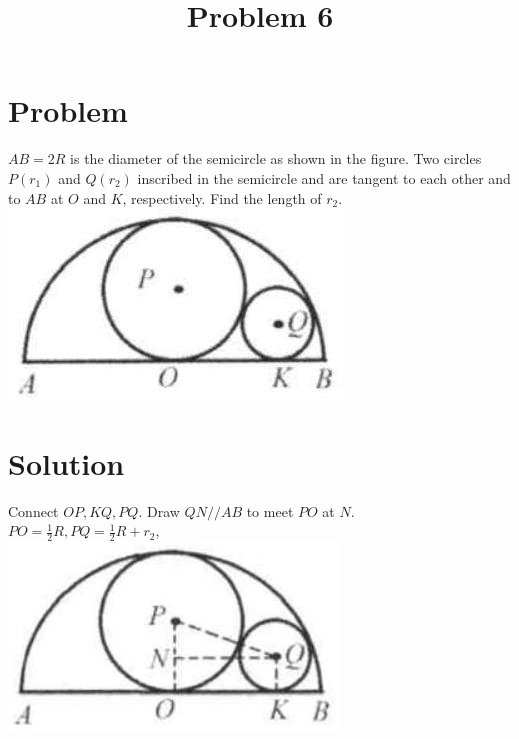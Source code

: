 \documentclass{article}
\title{Problem 6}
\date{}
\begin{document}
\maketitle

\section*{Problem}
\(A B=2 R\) is the diameter of the semicircle as shown in the figure. Two circles \(P\left(r_{1}\right)\) and \(Q\left(r_{2}\right)\) inscribed in the semicircle and are tangent to each other and to \(A B\) at \(O\) and \(K\), respectively. Find the length of \(r_{2}\).\\
\centering
\includegraphics[width=\textwidth]{images/problem_image_1.jpg}

\section*{Solution}
Connect \(O P, K Q, P Q\). Draw \(Q N / / A B\) to meet \(P O\) at \(N\).\\
\(P O=\frac{1}{2} R, P Q=\frac{1}{2} R+r_{2}\),\\
\centering
\includegraphics[width=\textwidth]{images/reasoning_image_1.jpg}
\end{document}
